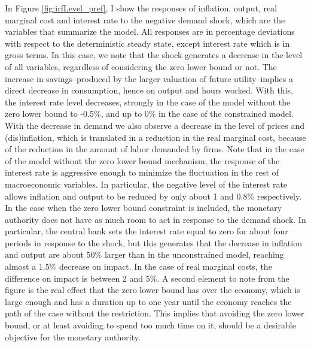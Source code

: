 \documentclass[12pt]{article}
\numberwithin{equation}{section}
\begin{document}
In Figure \ref{fig:irfLevel_pref}, I show the responses of inflation, output, real marginal cost and interest rate to the negative demand shock, which are the variables that summarize the model. All responses are in percentage deviations with respect to the deterministic steady state, except interest rate which is in gross terms. In this case, we note that the shock generates a decrease in the level of all variables, regardless of considering the zero lower bound or not. The increase in savings--produced by the larger valuation of future utility--implies a direct decrease in consumption, hence on output and hours worked. With this, the interest rate level decreases, strongly in the case of the model without the zero lower bound to -0.5\%, and up to 0\% in the case of the constrained model. With the decrease in demand we also observe a decrease in the level of prices and (dis)inflation, which is translated in a reduction in the real marginal cost, because of the reduction in the amount of labor demanded by firms. Note that in the case of the model without the zero lower bound mechanism, the response of the interest rate is aggressive enough to minimize the fluctuation in the rest of macroeconomic variables. In particular, the negative level of the interest rate allows inflation and output to be reduced by only about 1 and 0.8\% respectively. In the case when the zero lower bound constraint is included, the monetary authority does not have as much room to act in response to the demand shock. In particular, the central bank sets the interest rate equal to zero for about four periods in response to the shock, but this generates that the decrease in inflation and output are about 50\% larger than in the unconstrained model, reaching almost a 1.5\% decrease on impact. In the case of real marginal costs, the difference on impact is between 2 and 5\%. A second element to note from the figure is the real effect that the zero lower bound has over the economy, which is large enough and has a duration up to one year until the economy reaches the path of the case without the restriction. This implies that avoiding the zero lower bound, or at least avoiding to spend too much time on it, should be a desirable objective for the monetary authority.

\end{document}
